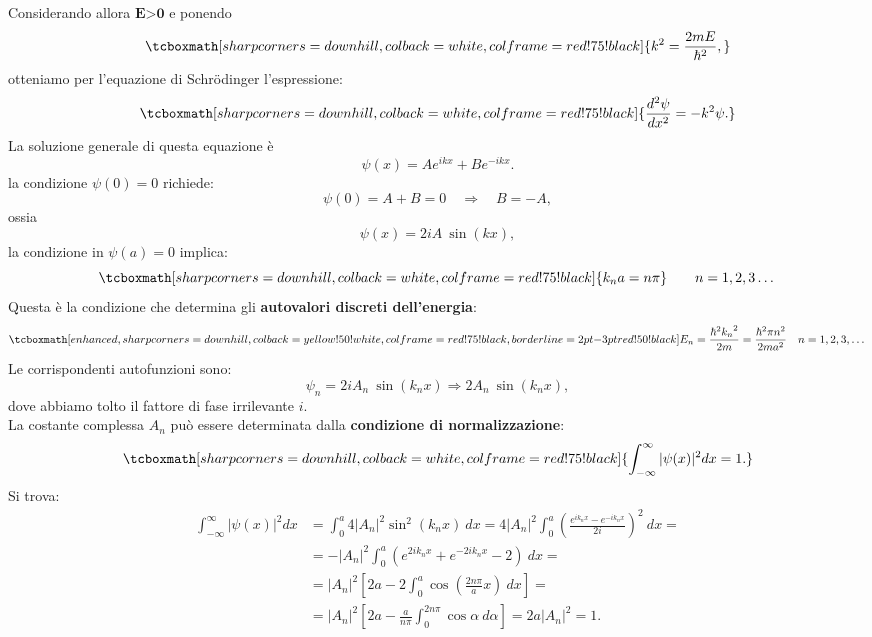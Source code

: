 Considerando allora $\textbf{E>0}$ e ponendo
	\begin{equation}
		\tcboxmath[sharp corners=downhill, colback=white, colframe=red!75!black]{
			k ^2 = \frac{2mE}{\hbar ^2},
			}
	\end{equation}
otteniamo per l'equazione di Schr\"{o}dinger l'espressione:
	\begin{equation}
		\tcboxmath[sharp corners=downhill, colback=white, colframe=red!75!black]{
			\frac{d^2 \psi}{dx^2}=-k ^2\psi.
			}
	\end{equation}
La soluzione generale di questa equazione è
	\begin{equation}
		\psi(x)= Ae^{ik x}+ Be^{-ik x}.
	\end{equation}
la condizione $\psi (0)=0$ richiede:
	\begin{equation}
		\psi(0)= A+ B=0 \quad \Rightarrow \quad B=-A,
	\end{equation}
ossia
	\begin{equation}
		\psi(x)= 2iA\ \sin{\left( k x \right)},
	\end{equation}
la condizione in $\psi (a)=0$ implica:
	\begin{equation}
		\tcboxmath[sharp corners=downhill, colback=white, colframe=red!75!black]{
			k_n a= n\pi
			} \qquad n=1,2,3\dots			
	\end{equation}
Questa è la condizione che determina gli \textbf{autovalori discreti dell'energia}:
	\begin{equation}
		\tcboxmath[enhanced, sharp corners=downhill, colback=yellow!50!white, colframe=red!75!black, borderline={2pt}{-3pt}{red!50!black}]{
			E_n= \frac{\hbar ^2 {k_n}^2}{2m}=\frac{\hbar ^2 \pi n^2}{2ma^2}
			} \quad n=1,2,3,\dots
	\end{equation}
Le corrispondenti autofunzioni sono:
	\begin{equation}
		\psi _n = 2iA_n\ \sin{\left( k_n x\right)} \Rightarrow 2A_n\ \sin{\left( k_n x \right)},
	\end{equation}
dove abbiamo tolto il fattore di fase irrilevante $i$.\\
La costante complessa $A_n$ può essere determinata dalla \textbf{condizione di normalizzazione}:
	\begin{equation}
		\tcboxmath[sharp corners=downhill, colback=white, colframe=red!75!black]{
			\int _{-\infty} ^{\infty} |\psi(x)| ^2 dx =1.
			}
	\end{equation}
Si trova:
	\begin{align}
		\int _{-\infty} ^{\infty} |\psi(x)| ^2 dx &= \int _{0} ^{a} 4|A_n| ^2 \sin ^2 {\left( k_n x \right)}\ dx= 4|A_n| ^2 \int _{0} ^{a} \left( \frac{e^{ik_n x}- e^{-ik_nx}}{2i}\right) ^2\ dx = \nonumber \\ 
		&= -|A_n| ^2 \int _{0} ^{a} \left( e^{2ik_n x}+ e^{-2ik_nx}-2\right)\  dx = \nonumber \\
		&= |A_n| ^2 \left[ 2a- 2 \int _{0} ^{a} \cos \left(\frac{2n \pi}{a} x\right)\   dx \right] = \nonumber \\
		&= |A_n| ^2 \left[ 2a- \frac{a}{n\pi} \int _{0} ^{2n\pi} \cos \alpha\   d\alpha \right] = 2a|A_n|^2= 1.
	\end{align}
